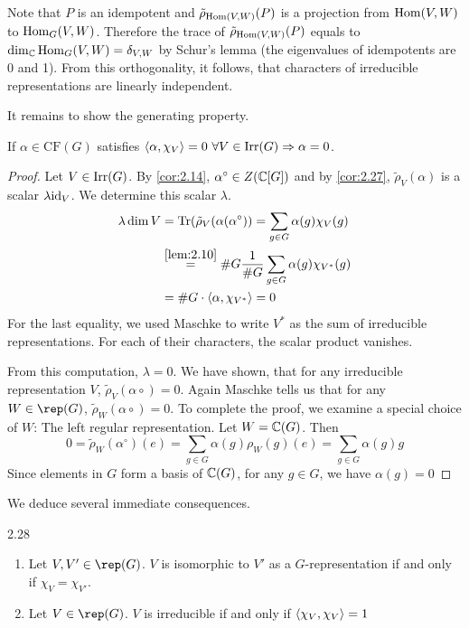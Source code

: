 \documentclass[twoside = false,	%
		headsepline,		%
		parskip = true,
		]{scrbook}						%
\begin{document}
    Note that $P$ is an idempotent and $\tilde\rho_{\mathrm{Hom}(V,W)}(P)$ is a projection from $\mathrm{Hom}(V,W)$ to $\mathrm{Hom}_G(V,W)$. Therefore the trace of $\tilde\rho_{\mathrm{Hom}(V,W)}(P)$ equals to  $\dim_\mathbb C\mathrm{Hom}_G(V,W)=\delta_{V,W}$ by Schur's lemma (the eigenvalues of idempotents are 0 and 1). From this orthogonality, it follows, that characters of irreducible representations are linearly independent.

    It remains to show the generating property.

    \begin{claim*}{}
        If $\alpha\in\text{CF}(G)$ satisfies $\left\langle \alpha,\chi_V\right\rangle=0\ \forall V\in\mathrm{Irr}(G)\Rightarrow \alpha=0$.
    \end{claim*}
    \begin{proof}
        Let $V\in\mathrm{Irr}(G)$. By \ref{cor:2.14}, $\alpha^\circ\in Z(\mathbb C[G])$ and by \ref{cor:2.27}, $\tilde\rho_V(\alpha)$ is a scalar $\lambda\mathrm{id}_V$. We determine this scalar $\lambda$.
        \begin{align*}
            \lambda\dim V &= \mathrm{Tr}(\tilde\rho_V(\alpha(\alpha^\circ))= \sum_{g\in G} \alpha(g) \chi_V(g)\\
            &\overset{\ref{lem:2.10}}= \#G\frac1{\#G}\sum_{g\in G}\alpha(g)\chi_{V^*}(g)\\
            &=\#G\cdot\left\langle \alpha, \chi_{V^*}\right\rangle=0
        \end{align*}
        For the last equality, we used Maschke to write $V^*$ as the sum of irreducible representations. For each of their characters, the scalar product vanishes.

        From this computation, $\lambda=0$. We have shown, that for any irreducible representation $V$, $\tilde\rho_V(\alpha\circ)=0$. Again Maschke tells us that for any $W\in\rep(G)$, $\tilde\rho_W(\alpha\circ)=0$.
        To complete the proof, we examine a special choice of $W$: The left regular representation. Let $W = \mathbb C(G)$. Then
        \begin{equation*}
            0 = \tilde{\rho}_W(\alpha^\circ)(e) = \sum_{g \in G} \alpha(g) \rho_W(g)(e) = \sum_{g \in G} \alpha(g)g
        \end{equation*}
        Since elements in $G$ form a basis of $\mathbb C(G)$, for any $g \in G$, we have $\alpha(g) = 0$
    \end{proof}
    We deduce several immediate consequences.
    \begin{corollary}{}{2.28}
        \begin{enumerate}
            \item
                Let $V,V' \in \rep(G)$. $V$ is isomorphic to $V'$ as a $G$-representation if and only if $\chi_V = \chi_{V'}$.
            \item
                Let $V \in \rep(G)$. $V$ is irreducible if and only if $\left\langle \chi_V,\chi_V\right\rangle = 1$
        \end{enumerate}
    \end{corollary}
\end{document}
